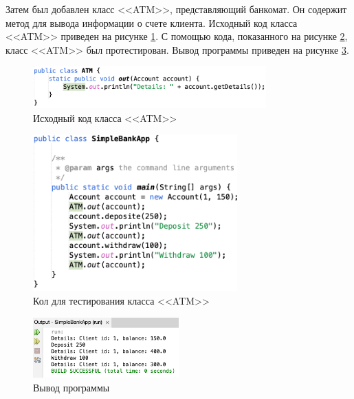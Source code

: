 \documentclass[a4paper, 14pt]{extarticle}
\begin{document}
Затем был добавлен класс <<\foreignlanguage{english}{ATM}>>, представляющий
банкомат. Он содержит метод для вывода информации о счете клиента. Исходный код
класса <<\foreignlanguage{english}{ATM}>> приведен на рисунке
\ref{fig:task-2-4}. С помощью кода, показанного на рисунке \ref{fig:task-2-5},
класс <<\foreignlanguage{english}{ATM}>> был протестирован. Вывод программы
приведен на рисунке \ref{fig:task-2-6}.

\begin{figure}[H]
  \centering
  \includegraphics[width=0.8\textwidth]{images/task-2/4.png}
  \caption{Исходный код класса <<\foreignlanguage{english}{ATM}>>}
  \label{fig:task-2-4}
\end{figure}

\begin{figure}[H]
  \centering
  \includegraphics[width=0.7\textwidth]{images/task-2/5.png}
  \caption{Кол для тестирования класса <<\foreignlanguage{english}{ATM}>>}
  \label{fig:task-2-5}
\end{figure}

\begin{figure}[H]
  \centering
  \includegraphics[width=0.5\textwidth]{images/task-2/6.png}
  \caption{Вывод программы}
  \label{fig:task-2-6}
\end{figure}
\end{document}

